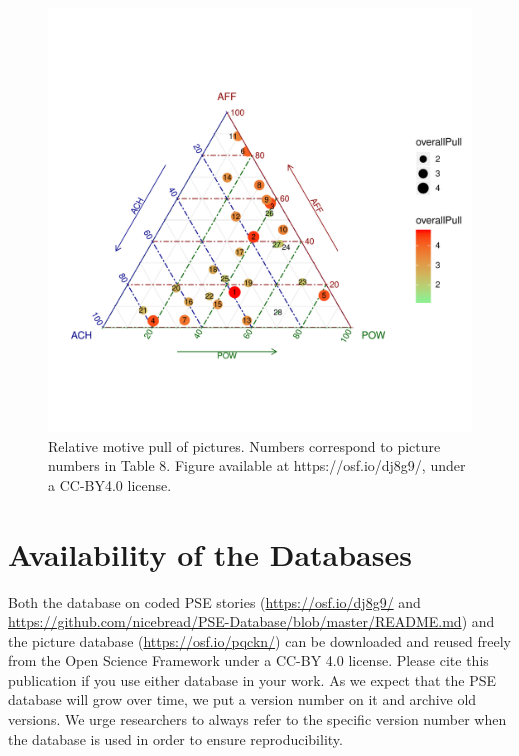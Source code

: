 \documentclass[man,a4paper,mask]{apa6}\usepackage[]{graphicx}\usepackage[]{color}
\newenvironment{knitrout}{}{} %
\begin{document}
\begin{knitrout}
\color{fgcolor}\begin{figure}

{\centering \includegraphics[width=.9\textwidth]{figure/ternary-1} 

}

\caption[Relative motive pull of pictures]{Relative motive pull of pictures. Numbers correspond to picture numbers in Table 8. Figure available at https://osf.io/dj8g9/, under a CC-BY4.0 license.}\label{fig:ternary}
\end{figure}


\end{knitrout}

\section{Availability of the Databases}

Both the database on coded PSE stories (\url{https://osf.io/dj8g9/} and \url{https://github.com/nicebread/PSE-Database/blob/master/README.md}) and the picture database (\url{https://osf.io/pqckn/}) can be downloaded and reused freely from the Open Science Framework under a CC-BY 4.0 license. Please cite this publication if you use either database in your work.
As we expect that the PSE database will grow over time, we put a version number on it and archive old versions. We urge researchers to always refer to the specific version number when the database is used in order to ensure reproducibility.
\end{document}
